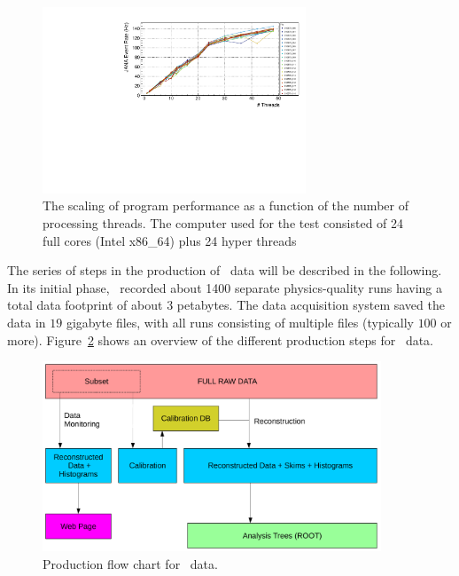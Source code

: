\begin{figure}[h!]\centering
\includegraphics[width=0.7\textwidth]{figures/OfflineMonitor_PlotA.pdf}
\caption[]{\label{fig:offline_monitorA}The scaling of program performance as a function of the number of processing threads. The computer used for the test consisted of 24 full cores (Intel x86\_64) plus 24 hyper threads}
\end{figure}

The series of steps in the production of \GX~data will be described in the following. In its initial phase, \GX~recorded about 1400 separate physics-quality runs having a total data footprint of about 3 petabytes. The data acquisition system saved the data in $19$ gigabyte files, with all runs consisting of multiple files (typically $100$ or more). Figure~\ref{fig:production_overview} shows an overview of the different production steps for \GX~data. 

\begin{figure}[h!]\centering
\includegraphics[width=0.9\textwidth]{figures/production_overview_calib_v2.pdf}
\caption[]{\label{fig:production_overview}Production flow chart for \GX~data.} 
\end{figure}

